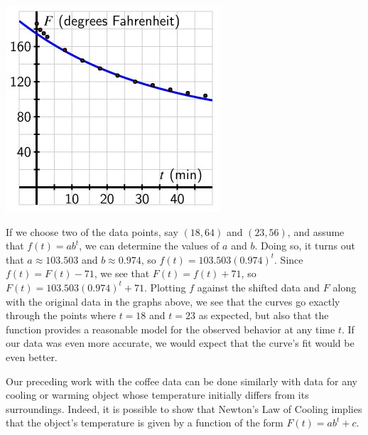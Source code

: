 \documentclass[nooutcomes]{ximera}
\begin{document}
\begin{image}
\includegraphics{ExpText10.jpg}
\end{image}

If we choose two of the data points, say \((18,64)\) and \((23,56)\), and assume that \(f(t) = ab^t\), we can determine the values of \(a\) and \(b\).  Doing so, it turns out that \(a \approx 103.503\) and \(b \approx 0.974\), so \(f(t) = 103.503 ( 0.974)^t\).  Since \(f(t) = F(t) - 71\), we see that \(F(t) = f(t) + 71\), so \(F(t) = 103.503 (0.974)^t + 71\).  Plotting \(f\) against the shifted data and \(F\) along with the original data in the graphs above, we see that the curves go exactly through the points where \(t = 18\) and \(t = 23\) as expected, but also that the function provides a reasonable model for the observed behavior at any time \(t\).  If our data was even more accurate, we would expect that the curve's fit would be even better.

Our preceding work with the coffee data can be done similarly with data for any cooling or warming object whose temperature initially differs from its surroundings.  Indeed, it is possible to show that Newton's Law of Cooling implies that the object's temperature is given by a function of the form \(F(t) = ab^t + c\).
\end{document}
